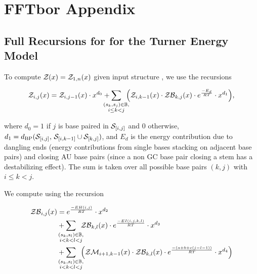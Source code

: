 
\chapter{FFTbor Appendix}
\label{ch:fftborapp}


\section{Full Recursions for \texorpdfstring{}{}
for the Turner Energy Model}
\label{sec:fftbor:turner}

To compute ${\mathcal Z}_{}(x) = {\mathcal Z}_{1,n}(x)$ given input structure \str, we use the recursions

\begin{align}
\label{eq:fftborapp:zx}
\emZ{i,j} = \emZ{i,j-1} \cdot x^{d_0} +
\sum_{\mathclap{\substack{(s_k,s_j) \in \bpSet, \\ i \leq k < j}}}\enspace
\Big( \emZ{i,k-1} \cdot \emZB{k,j} \cdot \boltzE{E_d} \cdot x^{d_1} \Big),
\end{align}

where $d_0 = 1$ if $j$ is base paired
in $\mathcal S_{[i,j]}$ and $0$ otherwise, $d_1 =
d_{\text{BP}}(\mathcal S_{[i,j]},\,\mathcal S_{[i,k-1]} \cup \mathcal S_{[k,j]})$, and $E_d$
is the energy contribution due to dangling ends (energy
contributions from single bases stacking on adjacent base pairs) and
closing AU base pairs (since a non GC base pair closing a stem has a
destabilizing effect).  The sum is taken over all possible
base pairs $(k,j)$ with $i \leq k < j$.

We compute \emZB{} using the recursion

\begin{align}
\label{eq:fftborapp:zbx}
\begin{split}
\emZB{i,j} &= \boltzE{EH(i,j)} \cdot x^{d_2} \\
&+ \sum_{\mathclap{\substack{(s_k,s_l) \in \bpSet, \\ i < k < l < j }}}\enspace
\emZB{k,l} \cdot \boltzE{EI(i,j,k,l)} \cdot x^{d_3} \\
&+ \sum_{\mathclap{\substack{(s_k,s_l) \in \bpSet, \\ i < k < l < j }}}\enspace
\Big( \emZM{i+1,k-1} \cdot \emZB{k,l} \cdot \boltzE{(a+b+c(j-l-1))}
\cdot x^{d_4} \Big)
\end{split}
\end{align}

